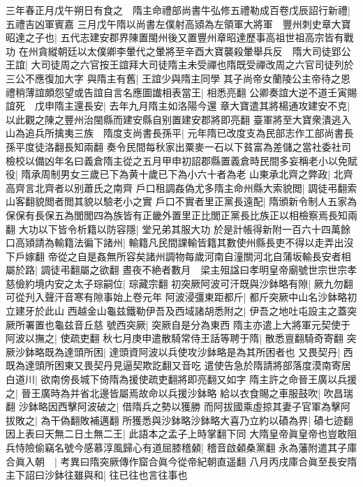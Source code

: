 三年春正月戊午朔日有食之　隋主命禮部尚書牛弘修五禮勒成百卷戊辰詔行新禮|{
	五禮吉凶軍賓嘉}
三月戊午隋以尚書左僕射高熲為左領軍大將軍　豐州刺史章大寶昭達之子也|{
	五代志建安郡界陳置閩州後又置豐州章昭達歷事高祖世祖高宗皆有戰功}
在州貪縱朝廷以太僕卿李暈代之暈將至辛酉大寶襲殺暈舉兵反　隋大司徒郢公王誼|{
	大司徒周之六官按王誼拜大司徒隋主未受禪也隋既受禪改周之六官司徒列於三公不應復加大字}
與隋主有舊|{
	王誼少與隋主同學}
其子尚帝女蘭陵公主帝待之恩禮稍薄誼頗怨望或告誼自言名應圖䜟相表當王|{
	相悉亮翻}
公卿奏誼大逆不道壬寅賜誼死　戊申隋主還長安|{
	去年九月隋主如洛陽今還}
章大寶遣其將楊通攻建安不克|{
	以此觀之陳之豐州治閩縣而建安縣自别置建安郡將即亮翻}
臺軍將至大寶衆潰逃入山為追兵所擒夷三族　隋度支尚書長孫平|{
	元年隋已改度支為民部志作工部尚書長孫平度徒洛翻長知兩翻}
奏令民間每秋家出粟麥一石以下貧富為差儲之當社委社司檢校以備凶年名曰義倉隋主從之五月甲申初詔郡縣置義倉時民間多妄稱老小以免賦役|{
	隋承周制男女三歲已下為黄十歲已下為小六十者為老}
山東承北齊之弊政|{
	北齊高齊言北齊者以别蕭氏之南齊}
戶口租調姦偽尤多隋主命州縣大索貌閲|{
	調徒弔翻索山客翻貌閲者閲其貌以驗老小之實}
戶口不實者里正黨長遠配|{
	隋頒新令制人五家為保保有長保五為閭閭四為族皆有正畿外置里正比閭正黨長比族正以相檢察焉長知兩翻}
大功以下皆令析籍以防容隱|{
	堂兄弟其服大功}
於是計帳得新附一百六十四萬餘口高熲請為輸籍法徧下諸州|{
	輸籍凡民間課輸皆籍其數使州縣長吏不得以走弄出沒下戶嫁翻}
帝從之自是姦無所容矣諸州調物每歲河南自潼關河北自蒲坂輸長安者相屬於路|{
	調徒弔翻屬之欲翻}
晝夜不絶者數月　梁主殂諡曰孝明皇帝廟號世宗世宗孝慈儉約境内安之太子琮嗣位|{
	琮藏宗翻}
初突厥阿波可汗既與沙鉢略有隙|{
	厥九勿翻可從刋入聲汗音寒有隙事始上卷元年}
阿波浸彊東距都斤|{
	都斤突厥中山名沙鉢略初立建牙於此山}
西越金山龜兹鐵勒伊吾及西域諸胡悉附之|{
	伊吾之地吐屯設主之蓋突厥所署置也龜兹音丘慈}
號西突厥|{
	突厥自是分為東西}
隋主亦遣上大將軍元契使于阿波以撫之|{
	使疏吏翻}
秋七月庚申遣散騎常侍王話等聘于隋|{
	散悉亶翻騎奇寄翻}
突厥沙鉢略既為達頭所困|{
	達頭資阿波以兵使攻沙鉢略是為其所困者也}
又畏契丹|{
	西既為達頭所困東又畏契丹見逼契欺訖翻又音吃}
遣使告急於隋請將部落度漠南寄居白道川|{
	欲南傍長城下倚隋為援使疏吏翻將即亮翻又如字}
隋主許之命晉王廣以兵援之|{
	晉王廣時為并省北邊皆屬焉故命以兵援沙鉢略}
給以衣食賜之車服鼓吹|{
	吹昌瑞翻}
沙鉢略因西擊阿波破之|{
	借隋兵之勢以獲勝}
而阿拔國乘虛掠其妻子官軍為擊阿拔敗之|{
	為干偽翻敗補邁翻}
所獲悉與沙鉢略沙鉢略大喜乃立約以磧為界|{
	磧七迹翻}
因上表曰天無二日土無二王|{
	此語本之孟子上時掌翻下同}
大隋皇帝眞皇帝也豈敢阻兵恃險偷竊名號今感慕淳風歸心有道屈膝稽顙|{
	稽音啟顙桑黨翻}
永為藩附遣其子庫合眞入朝　|{
	考異曰隋突厥傳作窟合眞今從帝紀朝直遥翻}
八月丙戌庫合眞至長安隋主下詔曰沙鉢往雖與和|{
	往已往也言往事也}
